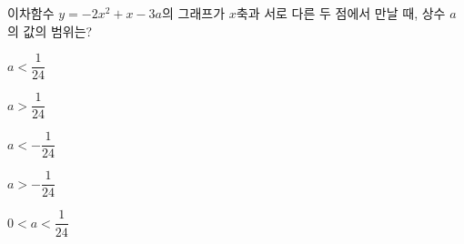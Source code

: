 이차함수 $y=-2x^2+x-3a$의 그래프가 $x$축과 서로 다른 두 점에서 만날 때, 상수 $a$의 값의 범위는?
\begin{choices32}{\rule[-3ex]{0pt}{8ex}$a<\dfrac{1}{24}$}{\rule[-3ex]{0pt}{8ex}$a>\dfrac{1}{24}$}{\rule[-3ex]{0pt}{8ex}$a<-\dfrac{1}{24}$}{\rule[-3ex]{0pt}{8ex}$a>-\dfrac{1}{24}$}{\rule[-3ex]{0pt}{8ex}$0<a<\dfrac{1}{24}$}\end{choices32}
